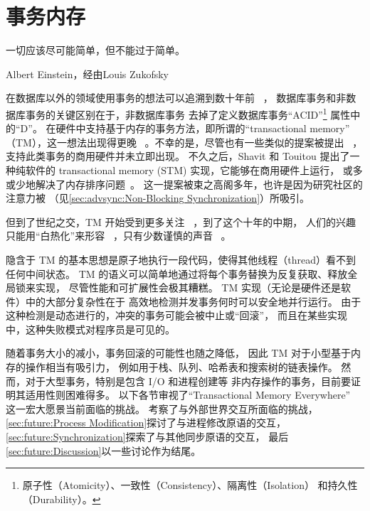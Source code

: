 
\section{事务内存}
\label{sec:future:Transactional Memory}
\epigraph{一切应该尽可能简单，但不能过于简单。}
	 {Albert Einstein，经由Louis Zukofsky}


在数据库以外的领域使用事务的想法可以追溯到数十年前
~\cite{DBLomet1977SIGSOFT,Knight:1986:AMF:319838.319854,Herlihy93a}，
数据库事务和非数据库事务的关键区别在于，非数据库事务
去掉了定义数据库事务``ACID''\footnote{
	原子性（Atomicity）、一致性（Consistency）、隔离性（Isolation）
	和持久性（Durability）。}
属性中的``D''。
在硬件中支持基于内存的事务方法，即所谓的``transactional memory''
（TM），这一想法出现得更晚
~\cite{Herlihy93a}。不幸的是，尽管也有一些类似的提案被提出
~\cite{JMStone93}，支持此类事务的商用硬件并未立即出现。
不久之后，Shavit 和 Touitou 提出了一种纯软件的
transactional memory (STM) 实现，它能够在商用硬件上运行，
或多或少地解决了内存排序问题~\cite{Shavit95}。
这一提案被束之高阁多年，也许是因为研究社区的注意力被
（见\cref{sec:advsync:Non-Blocking Synchronization}）所吸引。

但到了世纪之交，TM 开始受到更多关注
~\cite{Martinez01a,Rajwar01a}，到了这个十年的中期，
人们的兴趣只能用``白热化''来形容
~\cite{MauriceHerlihy2005-TM-manifesto.pldi,
DanGrossman2007TMGCAnalogy}，只有少数谨慎的声音
~\cite{Blundell2005DebunkTM,McKenney2007PLOSTM}。

隐含于 TM 的基本思想是原子地执行一段代码，使得其他线程（thread）看不到
任何中间状态。
TM 的语义可以简单地通过将每个事务替换为反复获取、释放全局锁来实现，
尽管性能和可扩展性会极其糟糕。
TM 实现（无论是硬件还是软件）中的大部分复杂性在于
高效地检测并发事务何时可以安全地并行运行。
由于这种检测是动态进行的，冲突的事务可能会被中止或``回滚''，
而且在某些实现中，这种失败模式对程序员是可见的。

随着事务大小的减小，事务回滚的可能性也随之降低，
因此 TM 对于小型基于内存的操作相当有吸引力，
例如用于栈、队列、哈希表和搜索树的链表操作。
然而，对于大型事务，特别是包含 I/O 和进程创建等
非内存操作的事务，目前要证明其适用性则困难得多。
以下各节审视了``Transactional Memory
Everywhere''~\cite{PaulEMcKenney2009TMeverywhere}
这一宏大愿景当前面临的挑战。
考察了与外部世界交互所面临的挑战，
\cref{sec:future:Process Modification}探讨了与进程修改原语的交互，
\cref{sec:future:Synchronization}探索了与其他同步原语的交互，
最后\cref{sec:future:Discussion}以一些讨论作为结尾。

